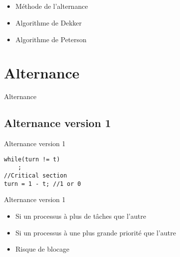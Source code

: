 \subsection{\subsectitle}
\begin{frame}{\sectitle}
    \begin{block}{\subsectitle}
        \begin{itemize}
            \item Méthode de l'alternance
            \item Algorithme de Dekker
            \item Algorithme de Peterson
        \end{itemize}
    \end{block}
\end{frame}
\def\sectitle{Alternance}
\section{\sectitle}
\begin{frame}[containsverbatim]{\sectitle}
    \def\subsectitle{Alternance version 1}
    \subsection{\subsectitle}
    \begin{exampleblock}{\subsectitle}
        \begin{verbatim}
while(turn != t)
    ;
//Critical section
turn = 1 - t; //1 or 0
\end{verbatim}
\end{exampleblock}

\begin{alertblock}{\subsectitle}
    \begin{itemize}
        \item Si un processus à plus de tâches que l'autre
        \item Si un processus à une plus grande priorité que l'autre
        \item Risque de blocage
    \end{itemize}
\end{alertblock}
\end{frame}

\def\sectitle{Dekker's algorithm}
